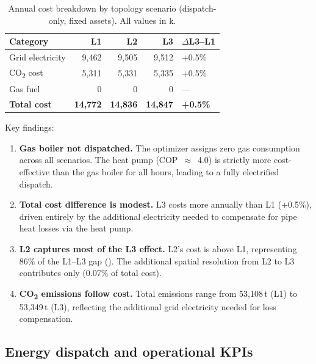 \documentclass[a4paper,fleqn]{cas-dc}
\begin{document}
\begin{table}[t]
\centering
\caption{Annual cost breakdown by topology scenario (dispatch-only, fixed assets). All values in k\EUR{}.}\label{tab:cost_breakdown}
\begin{tabular*}{\tblwidth}{@{}lrrrl@{}}
\toprule
Category & \textbf{L1} & \textbf{L2} & \textbf{L3} & $\Delta$L3--L1 \\
\midrule
Grid electricity & 9,462 & 9,505 & 9,512 & +0.5\% \\
CO\textsubscript{2} cost & 5,311 & 5,331 & 5,335 & +0.5\% \\
Gas fuel & 0 & 0 & 0 & --- \\
\midrule
\textbf{Total cost} & \textbf{14,772} & \textbf{14,836} & \textbf{14,847} & \textbf{+0.5\%} \\
\bottomrule
\end{tabular*}
\end{table}

Key findings:

\begin{enumerate}
\item \textbf{Gas boiler not dispatched.} The optimizer assigns zero gas consumption across all scenarios. The heat pump (COP~$\approx$~4.0) is strictly more cost-effective than the gas boiler for all hours, leading to a fully electrified dispatch.

\item \textbf{Total cost difference is modest.} L3 costs  more annually than L1 (+0.5\%), driven entirely by the additional electricity needed to compensate for pipe heat losses via the heat pump.

\item \textbf{L2 captures most of the L3 effect.} L2's cost is  above L1, representing 86\% of the L1--L3 gap (). The additional spatial resolution from L2 to L3 contributes only  (0.07\% of total cost).

\item \textbf{CO\textsubscript{2} emissions follow cost.} Total emissions range from 53,108\,t (L1) to 53,349\,t (L3), reflecting the additional grid electricity needed for loss compensation.
\end{enumerate}

\subsection{Energy dispatch and operational KPIs}
\end{document}
